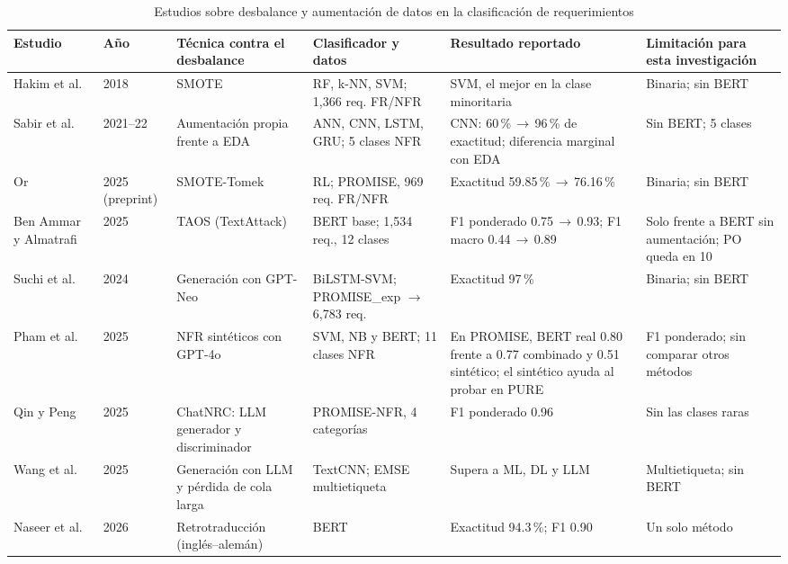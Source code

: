\documentclass[conference]{IEEEtran}
\begin{document}
\begin{table}[!t]
\caption{Estudios sobre desbalance y aumentación de datos en la clasificación de requerimientos}
\label{tab:matriz-aum}
\centering\footnotesize
\begin{tabularx}{\textwidth}{@{}L{2.6cm} L{0.75cm} Y Y Y Y@{}}
\toprule
\textbf{Estudio} & \textbf{Año} & \textbf{Técnica contra el desbalance} & \textbf{Clasificador y datos} & \textbf{Resultado reportado} & \textbf{Limitación para esta investigación} \\
\midrule
Hakim et al.~\cite{Hakim2018-Oversampling} & 2018 & SMOTE & RF, k-NN, SVM; 1,366 req. FR/NFR & SVM, el mejor en la clase minoritaria & Binaria; sin BERT \\
Sabir et al.~\cite{Sabir2021-DeepLearning,Sabir2022-Custom} & 2021--22 & Aumentación propia frente a EDA & ANN, CNN, LSTM, GRU; 5 clases NFR & CNN: 60\,\%\,$\rightarrow$\,96\,\% de exactitud; diferencia marginal con EDA & Sin BERT; 5 clases \\
Or~\cite{Or2025-SMOTETomek} & 2025 (preprint) & SMOTE-Tomek & RL; PROMISE, 969 req. FR/NFR & Exactitud 59.85\,\%\,$\rightarrow$\,76.16\,\% & Binaria; sin BERT \\
Ben Ammar y Almatrafi~\cite{BenAmmar2025-TAOS} & 2025 & TAOS (TextAttack) & BERT base; 1,534 req., 12 clases & F1 ponderado 0.75\,$\rightarrow$\,0.93; F1 macro 0.44\,$\rightarrow$\,0.89 & Solo frente a BERT sin aumentación; PO queda en 10 \\
Suchi et al.~\cite{Suchi2024-Explainable} & 2024 & Generación con GPT-Neo & BiLSTM-SVM; PROMISE\_exp $\rightarrow$ 6,783 req. & Exactitud 97\,\% & Binaria; sin BERT \\
Pham et al.~\cite{Pham2025-Generating} & 2025 & NFR sintéticos con GPT-4o & SVM, NB y BERT; 11 clases NFR & En PROMISE, BERT real 0.80 frente a 0.77 combinado y 0.51 sintético; el sintético ayuda al probar en PURE & F1 ponderado; sin comparar otros métodos \\
Qin y Peng~\cite{Qin2025-ChatNRC} & 2025 & ChatNRC: LLM generador y discriminador & PROMISE-NFR, 4 categorías & F1 ponderado 0.96 & Sin las clases raras \\
Wang et al.~\cite{Wang2025-Learning} & 2025 & Generación con LLM y pérdida de cola larga & TextCNN; EMSE multietiqueta & Supera a ML, DL y LLM & Multietiqueta; sin BERT \\
Naseer et al.~\cite{Naseer2026-Fused} & 2026 & Retrotraducción (inglés--alemán) & BERT & Exactitud 94.3\,\%; F1 0.90 & Un solo método \\

\end{tabularx}
\end{table}
\end{document}
